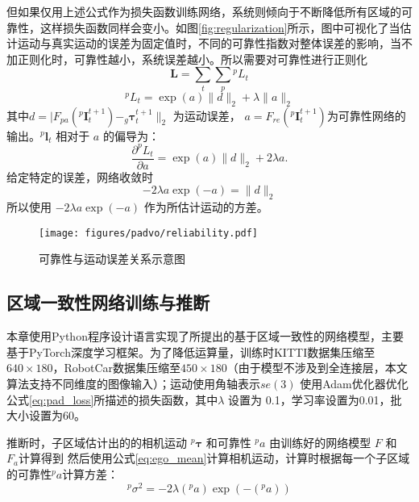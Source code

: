 但如果仅用上述公式作为损失函数训练网络，系统则倾向于不断降低所有区域的可靠性，这样损失函数同样会变小。如图\ref{fig:regularization}所示，图中可视化了当估计运动与真实运动的误差为固定值时，不同的可靠性指数对整体误差的影响，当不加正则化时，可靠性越小，系统误差越小。所以需要对可靠性进行正则化
\begin{equation}
  \mathbf{L} = \sum_t \sum_p  {^pL_t}
\end{equation}
\begin{equation}
    ^pL_t = \exp(a)\|d\|_2+ \lambda\|a\|_2
\end{equation}
其中$d =|F_{pa}\left(^p\mathbf{I}_t^{t+1}\right)-_g\mathbf{\tau}_t^{t+1}\|_2 $ 为运动误差， $a = F_{re}\left(^p\mathbf{I}_t^{t+1}\right)$为可靠性网络的输出。$^p\mathbf{l}_t$ 相对于 $a$ 的偏导为：
\begin{equation}
   \frac{ \partial ^pL_t}{\partial a}= \exp(a)\|d\|_2 + 2\lambda a.
   \label{eq:pad_loss}
\end{equation}
给定特定的误差，网络收敛时
\begin{equation}
    -2\lambda a \exp(-a) = \|d\|_2
    \label{eq:var_by_reli}
\end{equation}
所以使用 $-2\lambda a \exp(-a)$ 作为所估计运动的方差。
\begin{figure}[h]
  \centering
  \texttt{[image: figures/padvo/reliability.pdf]}
  \caption{可靠性与运动误差关系示意图}
  \label{fig:reliability}
\end{figure}
\subsection{区域一致性网络训练与推断}
本章使用Python程序设计语言实现了所提出的基于区域一致性的网络模型，主要基于PyTorch深度学习框架。为了降低运算量，训练时KITTI数据集压缩至$640\times180$，RobotCar数据集压缩至$450\times180$（由于模型不涉及到全连接层，本文算法支持不同维度的图像输入）；运动使用角轴表示$\textit{se}(3)$
使用Adam优化器优化公式\eqref{eq:pad_loss}所描述的损失函数，其中$\lambda$ 设置为 0.1，学习率设置为0.01，批大小设置为60。

推断时，子区域估计出的的相机运动 $^p\mathbf{\tau}$ 和可靠性 $^pa$ 由训练好的网络模型 $F$ 和 $F_a$计算得到
然后使用公式\eqref{eq:ego_mean}计算相机运动，计算时根据每一个子区域的可靠性$^pa$计算方差：
\begin{equation}
  ^p\sigma^2= -2\lambda (^pa) \exp(-(^pa)) 
\end{equation}



